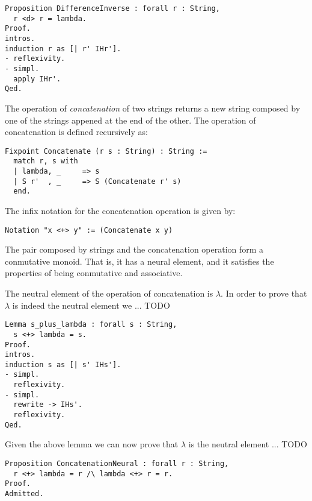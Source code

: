 \begin{sourcecode}
{\scriptsize \begin{verbatim}
Proposition DifferenceInverse : forall r : String,
  r <d> r = lambda.
Proof.
intros.
induction r as [| r' IHr'].
- reflexivity.
- simpl.
  apply IHr'.
Qed.
\end{verbatim}}
\end{sourcecode}

The operation of \emph{concatenation} of two strings returns a new string composed by one of the strings appened at the end of the other. The operation of concatenation is defined recursively as:

\begin{sourcecode}
{\scriptsize \begin{verbatim}
Fixpoint Concatenate (r s : String) : String :=
  match r, s with
  | lambda, _     => s
  | S r'  , _     => S (Concatenate r' s)
  end.
\end{verbatim}}
\end{sourcecode}

The infix notation for the concatenation operation is given by:

\begin{sourcecode}
{\scriptsize \begin{verbatim}
Notation "x <+> y" := (Concatenate x y)
\end{verbatim}}
\end{sourcecode}

The pair composed by strings and the concatenation operation form a conmutative monoid. That is, it has a neural element, and it satisfies the properties of being conmutative and associative.

The neutral element of the operation of concatenation is $\lambda$. In order to prove that $\lambda$ is indeed the neutral element we ... {\color{red} TODO}

\begin{sourcecode}
{\scriptsize \begin{verbatim}
Lemma s_plus_lambda : forall s : String,
  s <+> lambda = s.
Proof.
intros.
induction s as [| s' IHs'].
- simpl.
  reflexivity.
- simpl.
  rewrite -> IHs'.
  reflexivity.
Qed.
\end{verbatim}}
\end{sourcecode}

Given the above lemma we can now prove that $\lambda$ is the neutral element ... {\color{red} TODO}

\begin{sourcecode}
{\scriptsize \begin{verbatim}
Proposition ConcatenationNeural : forall r : String,
  r <+> lambda = r /\ lambda <+> r = r.
Proof.
Admitted.
\end{verbatim}}
\end{sourcecode}

